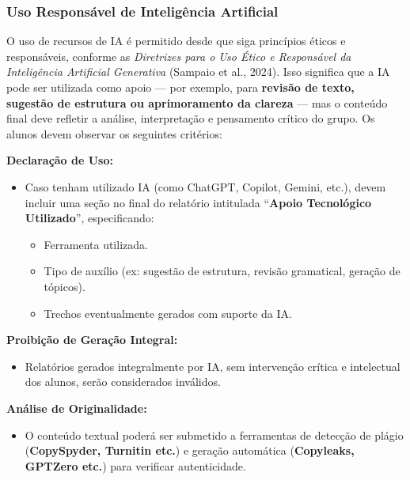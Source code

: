 \documentclass[
  a4paper,
]{book}
\providecommand{\tightlist}{%
  \setlength{\itemsep}{0pt}\setlength{\parskip}{0pt}}\usepackage{longtable,booktabs,array}
\begin{document}
\subsubsection{Uso Responsável de Inteligência Artificial
🤖}\label{uso-responsuxe1vel-de-inteliguxeancia-artificial}

O uso de recursos de IA é permitido desde que siga princípios éticos e
responsáveis, conforme as \emph{Diretrizes para o Uso Ético e
Responsável da Inteligência Artificial Generativa} (Sampaio et al.,
2024). Isso significa que a IA pode ser utilizada como apoio --- por
exemplo, para \textbf{revisão de texto, sugestão de estrutura ou
aprimoramento da clareza} --- mas o conteúdo final deve refletir a
análise, interpretação e pensamento crítico do grupo. Os alunos devem
observar os seguintes critérios:

\textbf{Declaração de Uso:}

\begin{itemize}
\item
  Caso tenham utilizado IA (como ChatGPT, Copilot, Gemini, etc.), devem
  incluir uma seção no final do relatório intitulada ``\textbf{Apoio
  Tecnológico Utilizado}'', especificando:

  \begin{itemize}
  \tightlist
  \item
    Ferramenta utilizada.
  \item
    Tipo de auxílio (ex: sugestão de estrutura, revisão gramatical,
    geração de tópicos).
  \item
    Trechos eventualmente gerados com suporte da IA.
  \end{itemize}
\end{itemize}

\textbf{Proibição de Geração Integral:}

\begin{itemize}
\tightlist
\item
  Relatórios gerados integralmente por IA, sem intervenção crítica e
  intelectual dos alunos, serão considerados inválidos.
\end{itemize}

\textbf{Análise de Originalidade:}

\begin{itemize}
\tightlist
\item
  O conteúdo textual poderá ser submetido a ferramentas de detecção de
  plágio (\textbf{CopySpyder, Turnitin etc.}) e geração automática
  (\textbf{Copyleaks, GPTZero etc.}) para verificar autenticidade.
\end{itemize}
\end{document}
